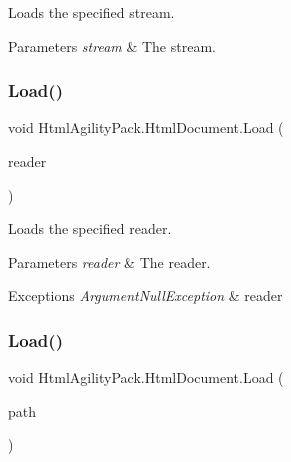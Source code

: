 Loads the specified stream. 


\begin{DoxyParams}{Parameters}
{\em stream} & The stream.\\
\hline
\end{DoxyParams}
\mbox{\label{class_html_agility_pack_1_1_html_document_a54aea4a96c18e6b345fc661d998fbddd}} 
\subsubsection{\texorpdfstring{Load()}{Load()}\hspace{0.1cm}{\footnotesize\ttfamily [2/11]}}
{\footnotesize\ttfamily void Html\+Agility\+Pack.\+Html\+Document.\+Load (\begin{DoxyParamCaption}\item[{Text\+Reader}]{reader }\end{DoxyParamCaption})\hspace{0.3cm}{\ttfamily [inline]}}



Loads the specified reader. 


\begin{DoxyParams}{Parameters}
{\em reader} & The reader.\\
\hline
\end{DoxyParams}

\begin{DoxyExceptions}{Exceptions}
{\em Argument\+Null\+Exception} & reader\\
\hline
\end{DoxyExceptions}
\mbox{\label{class_html_agility_pack_1_1_html_document_a206d7e6b554ac1d08bfc83609db66716}} 
\subsubsection{\texorpdfstring{Load()}{Load()}\hspace{0.1cm}{\footnotesize\ttfamily [3/11]}}
{\footnotesize\ttfamily void Html\+Agility\+Pack.\+Html\+Document.\+Load (\begin{DoxyParamCaption}\item[{string}]{path }\end{DoxyParamCaption})\hspace{0.3cm}{\ttfamily [inline]}}



